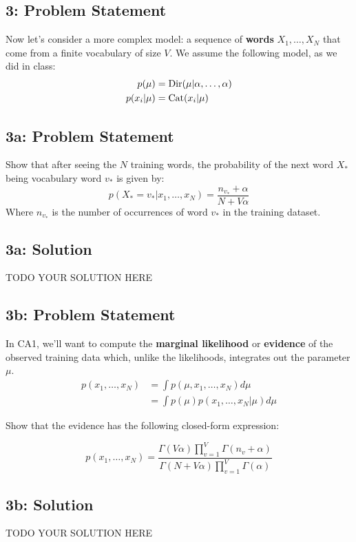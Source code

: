 \documentclass[10pt]{article}
\newcommand{\officialdirections}[1]{{\color{purple} #1}}
\begin{document}
\newpage
\officialdirections{
\subsection*{3: Problem Statement}
Now let's consider a more complex model: a sequence of \textbf{words} $X_1, \ldots, X_N$ that come from a finite vocabulary of size $V$. We assume the following model, as we did in class:
\begin{align*}
p(\mu) &= \textnormal{Dir}(\mu|\alpha, \ldots, \alpha)\\
p(x_i|\mu) &= \textnormal{Cat}(x_i|\mu)
\end{align*}
\vspace{-10mm}
}
\officialdirections{\subsection*{3a: Problem Statement}
Show that after seeing the $N$ training words, the probability of the next word $X_*$ being vocabulary word $v_*$ is given by:
\begin{equation}
p(X_* = v_*|x_1,\ldots,x_N) = \frac{n_{v_*} + \alpha}{N + V\alpha}
\end{equation}
Where $n_{v_*}$ is the number of occurrences of word $v_*$ in the training dataset.
}

\subsection{3a: Solution}

TODO YOUR SOLUTION HERE

\newpage
\officialdirections{\subsection*{3b: Problem Statement}
In CA1, we'll want to compute the \textbf{marginal likelihood} or \textbf{evidence} of the observed training data which, unlike the likelihoods, integrates out the parameter $\mu$.
\begin{align*}
p(x_1,\ldots,x_N) &= \int p(\mu, x_1, \ldots, x_N) d\mu\\
&= \int p(\mu)p( x_1, \ldots, x_N|\mu) d\mu
\end{align*}


Show that the evidence has the following closed-form expression:

\begin{equation*}
p(x_1,\ldots, x_N) = \frac
	{ \Gamma(V \alpha)      \prod_{v=1}^V \Gamma( n_v + \alpha ) }
	{ \Gamma(N + V \alpha ) \prod_{v=1}^V \Gamma(\alpha)         }
\end{equation*}
}

\subsection{3b: Solution}

TODO YOUR SOLUTION HERE
\end{document}
